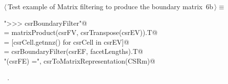 \documentclass[11pt,oneside]{article}	%
\begin{document}
\begin{flushleft} \small
\begin{minipage}{\linewidth} \label{scrap14}
\protect{}$\langle\,$Test example of Matrix filtering to produce the boundary matrix\nobreak\ {\footnotesize 6b}$\,\rangle\equiv$
\vspace{-1ex}
\begin{list}{}{} \item
\mbox{}\verb@print "\n>>> csrBoundaryFilter"@\\
\mbox{}\verb@csrEF = matrixProduct(csrFV, csrTranspose(csrEV)).T@\\
\mbox{}\verb@facetLengths = [csrCell.getnnz() for csrCell in csrEV]@\\
\mbox{}\verb@CSRm = csrBoundaryFilter(csrEF, facetLengths).T@\\
\mbox{}\verb@print "\ncsrMaxFilter(csrFE) =\n", csrToMatrixRepresentation(CSRm)@\\
\mbox{}\verb@@{\NWsep}
\end{list}
\vspace{-1ex}
\footnotesize\addtolength{\baselineskip}{-1ex}
\begin{list}{}{\setlength{\itemsep}{-\parsep}\setlength{\itemindent}{-\leftmargin}}
\item \NWtxtMacroRefIn\ .
\end{list}
\end{minipage}\\[4ex]
\end{flushleft}
\end{document}
